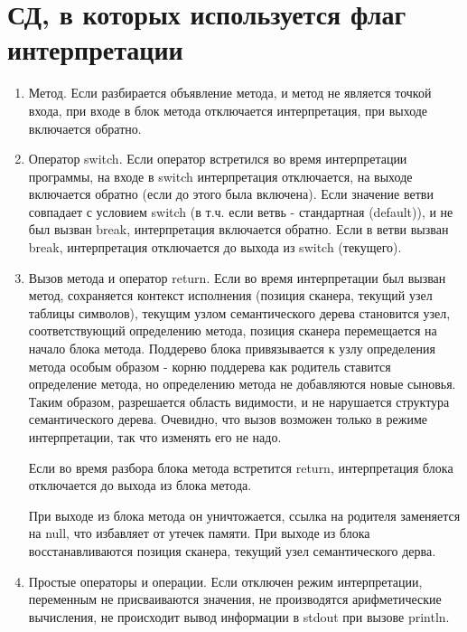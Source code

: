 \documentclass[a4paper,12pt]{article}
\begin{document}
\section{СД, в которых используется флаг интерпретации}
\begin{flushleft}
  \justify
  \begin{enumerate}
    \item Метод.
    Если разбирается объявление метода, и метод не является точкой входа, при входе в блок метода отключается интерпретация, при выходе включается обратно.
    \item Оператор switch.
    Если оператор встретился во время интерпретации программы, на входе в switch интерпретация отключается, на выходе включается обратно (если до этого была включена).
    Если значение ветви совпадает с условием switch (в т.ч. если ветвь - стандартная (default)), и не был вызван break, интерпретация включается обратно.
    Если в ветви вызван break, интерпретация отключается до выхода из switch (текущего).
    \item Вызов метода и оператор return.
    Если во время интерпретации был вызван метод, сохраняется контекст исполнения (позиция сканера, текущий узел таблицы символов), текущим узлом семантического дерева
    становится узел, соответствующий определению метода, позиция сканера перемещается на начало блока метода. Поддерево блока привязывается к узлу определения метода
    особым образом - корню поддерева как родитель ставится определение метода, но определению метода не добавляются новые сыновья. Таким образом, разрешается область видимости,
    и не нарушается структура семантического дерева. Очевидно, что вызов возможен только в режиме интерпретации, так что изменять его не надо.

    Если во время разбора блока метода встретится return, интерпретация блока отключается до выхода из блока метода.

    При выходе из блока метода он уничтожается, ссылка на родителя заменяется на null, что избавляет от утечек памяти. При выходе из блока восстанавливаются позиция сканера,
    текущий узел семантического дерва.
    \item Простые операторы и операции.
    Если отключен режим интерпретации, переменным не присваиваются значения, не производятся арифметические вычисления, не происходит вывод информации в stdout при вызове println.
  \end{enumerate}
\end{flushleft}
\end{document}
